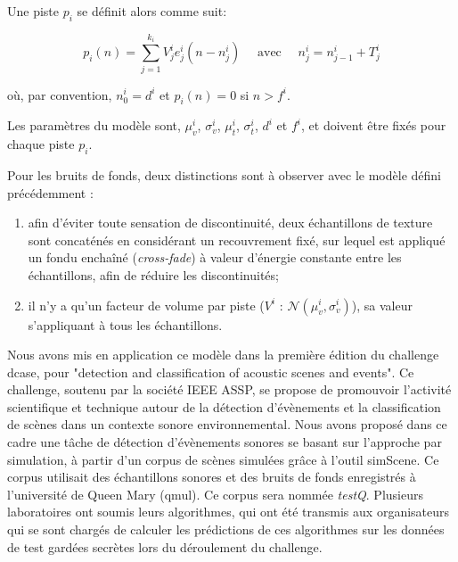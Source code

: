   Une piste $p_i$ se définit alors comme suit:

  \begin{equation}
  \label{eq:ch4_eq2}
  p_{i}(n)= \sum_{j=1}^{k_i} V_j^i e_j^i(n-n_j^i) \quad \textrm{ avec } \quad n_j^i=n_{j-1}^i + T_j^i
  \end{equation}

  où, par convention, $n^i_0=d^i$ et $p_i(n)=0$ si $n>f^i$.

  Les paramètres du modèle sont, $\mu_v^i$, $\sigma_v^i$, $\mu_t^i$, $\sigma_t^i$, $d^i$ et $f^i$, et doivent être fixés pour chaque piste $p_i$. %

  Pour les bruits de fonds, deux distinctions sont à observer avec le modèle défini précédemment :

  \begin{enumerate}
  \item afin d'éviter toute sensation de discontinuité, deux échantillons de texture sont concaténés en considérant un recouvrement fixé, sur lequel est appliqué un fondu enchaîné (\emph{cross-fade}) à valeur d'énergie constante entre les échantillons, afin de réduire les discontinuités;
  \item il n'y a qu'un facteur de volume par piste ($V^i \textrm{ : } \mathcal{N}(\mu_v^{i},\sigma_v^{i})$), sa valeur s'appliquant à tous les échantillons.
  \end{enumerate}


  Nous avons mis en application ce modèle dans la première édition du challenge dcase, pour "detection and classification of acoustic scenes and events". Ce challenge, soutenu par la société IEEE ASSP, se propose de promouvoir l'activité scientifique et technique autour de la détection d'évènements et la classification de scènes dans un contexte sonore environnemental. Nous avons proposé dans ce cadre une tâche de détection d'évènements sonores se basant sur l'approche par simulation, à partir d'un corpus de scènes simulées grâce à l'outil simScene. Ce corpus utilisait des échantillons sonores et des bruits de fonds enregistrés à l'université de Queen Mary (qmul). Ce corpus sera nommée \emph{testQ}. Plusieurs laboratoires ont soumis leurs algorithmes, qui ont été transmis aux organisateurs qui se sont chargés de calculer les prédictions de ces algorithmes sur les données de test gardées secrètes lors du déroulement du challenge.


